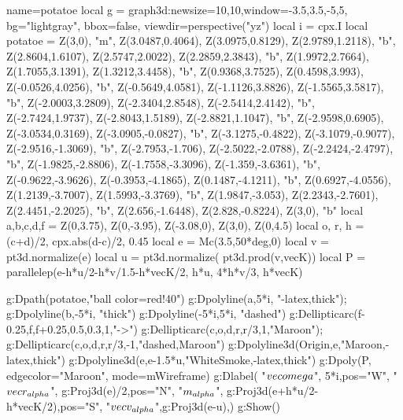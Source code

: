 \documentclass[border=5pt]{standalone}%
\begin{document}
\begin{luadraw}{name=potatoe}
local g = graph3d:new{size={10,10},window={-3.5,3.5,-5,5}, bg="lightgray", bbox=false, viewdir=perspective("yz")}
local i = cpx.I
local potatoe = { Z(3,0), "m", Z(3.0487,0.4064), Z(3.0975,0.8129), Z(2.9789,1.2118), "b", Z(2.8604,1.6107), Z(2.5747,2.0022), Z(2.2859,2.3843), "b", Z(1.9972,2.7664), Z(1.7055,3.1391), Z(1.3212,3.4458), "b", Z(0.9368,3.7525), Z(0.4598,3.993), Z(-0.0526,4.0256), "b", Z(-0.5649,4.0581), Z(-1.1126,3.8826), Z(-1.5565,3.5817), "b", Z(-2.0003,3.2809), Z(-2.3404,2.8548), Z(-2.5414,2.4142), "b", Z(-2.7424,1.9737), Z(-2.8043,1.5189), Z(-2.8821,1.1047), "b", Z(-2.9598,0.6905), Z(-3.0534,0.3169), Z(-3.0905,-0.0827), "b", Z(-3.1275,-0.4822), Z(-3.1079,-0.9077), Z(-2.9516,-1.3069), "b", Z(-2.7953,-1.706), Z(-2.5022,-2.0788), Z(-2.2424,-2.4797), "b", Z(-1.9825,-2.8806), Z(-1.7558,-3.3096), Z(-1.359,-3.6361), "b", Z(-0.9622,-3.9626), Z(-0.3953,-4.1865), Z(0.1487,-4.1211), "b", Z(0.6927,-4.0556), Z(1.2139,-3.7007), Z(1.5993,-3.3769), "b", Z(1.9847,-3.053), Z(2.2343,-2.7601), Z(2.4451,-2.2025), "b", Z(2.656,-1.6448), Z(2.828,-0.8224), Z(3,0), "b"}  
local a,b,c,d,f = Z(0,3.75), Z(0,-3.95), Z(-3.08,0), Z(3,0), Z(0,4.5)
local o, r, h = (c+d)/2, cpx.abs(d-c)/2, 0.45
local e =  Mc(3.5,50*deg,0)
local v = pt3d.normalize(e)
local u = pt3d.normalize( pt3d.prod(v,vecK))
local P = parallelep(e-h*u/2-h*v/1.5-h*vecK/2, h*u, 4*h*v/3, h*vecK) 

g:Dpath(potatoe,"ball color=red!40")
g:Dpolyline({a,5*i}, "-latex,thick"); g:Dpolyline({b,-5*i}, "thick")
g:Dpolyline({-5*i,5*i}, "dashed")
g:Dellipticarc(f-0.25,f,f+0.25,0.5,0.3,1,"->")
g:Dellipticarc(c,o,d,r,r/3,1,"Maroon"); g:Dellipticarc(c,o,d,r,r/3,-1,"dashed,Maroon")
g:Dpolyline3d({Origin,e},"Maroon,-latex,thick")
g:Dpolyline3d({e,e-1.5*u},"WhiteSmoke,-latex,thick")
g:Dpoly(P, {edgecolor="Maroon", mode=mWireframe})
g:Dlabel( "$\\vec{\\omega}$", 5*i,{pos="W"}, "$\\vec{r}_{\\alpha}$", g:Proj3d(e)/2,{pos="N"},
    "$m_{\\alpha}$", g:Proj3d(e+h*u/2-h*vecK/2),{pos="S"}, "$\\vec{v}_{\\alpha}$",g:Proj3d(e-u),{})
g:Show()
\end{luadraw}
\end{document}
